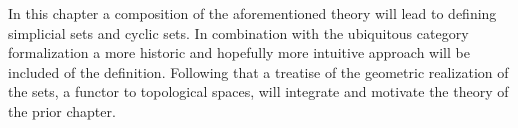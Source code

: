 \documentclass[../../main.tex]{subfiles}
\begin{document}
    In this chapter a composition of the aforementioned theory will lead to defining simplicial sets and cyclic sets. In combination with the ubiquitous category formalization a more historic and hopefully more intuitive approach will be included of the definition. Following that a treatise of the geometric realization of the sets, a functor to topological spaces, will integrate and motivate the theory of the prior chapter. 
\end{document}
